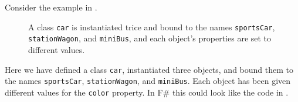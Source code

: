 \documentclass[fsharpNotes.tex]{subfiles}
\begin{document}
Consider the example in .
\begin{figure}
  \centering
  \caption{A class \lstinline{car} is instantiated trice and bound to the names \lstinline{sportsCar}, \lstinline{stationWagon}, and \lstinline{miniBus}, and each object's properties are set to different values.}
  \label{fig:instantiation}
\end{figure}
Here we have defined a class \lstinline{car}, instantiated three objects, and bound them to the names \lstinline{sportsCar}, \lstinline{stationWagon}, and \lstinline{miniBus}. Each object has been given different values for the \lstinline{color} property. In F\# this could look like the code in .
%
%
%
\end{document}
